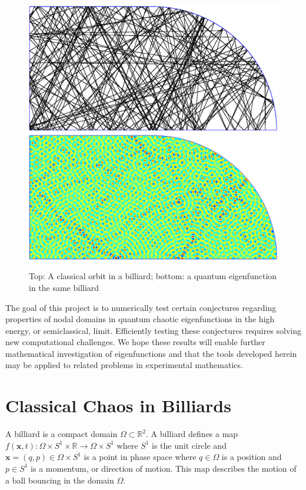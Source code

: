 \documentclass{report}
\newcommand{\xx}[0]{\mathbf{x}}
\begin{document}
\begin{figure}
  \begin{center}
    \includegraphics[width=\textwidth]{figs/classical/stadium_orbit.eps}
    \linebreak
    \includegraphics[width=\textwidth]{figs/classical/stadium_eigenfunction.eps}
    \caption{Top: A classical orbit in a billiard; bottom: a quantum eigenfunction in the same billiard}
    \label{fig:classical_vs_quantum}
  \end{center}
\end{figure}

The goal of this project is to numerically test certain conjectures regarding properties of nodal domains in quantum chaotic eigenfunctions in the high energy, or semiclassical, limit. Efficiently testing these conjectures requires solving new computational challenges. We hope these results will enable further mathematical investigation of eigenfunctions and that the tools developed herein may be applied to related problems in experimental mathematics.

\section{Classical Chaos in Billiards}
\label{sec:classical}
A billiard is a compact domain $\Omega \subset \mathbb{R}^{2}$. A billiard defines a map $f(\xx, t): \Omega \times S^{1} \times \mathbb{R} \rightarrow \Omega \times S^{1}$ where $S^{1}$ is the unit circle and $\xx = (q, p) \in \Omega \times S^{1}$ is a point in phase space where $q \in \Omega$ is a position and $p \in S^{1}$ is a momentum, or direction of motion. This map describes the motion of a ball bouncing in the domain $\Omega$.
\end{document}
